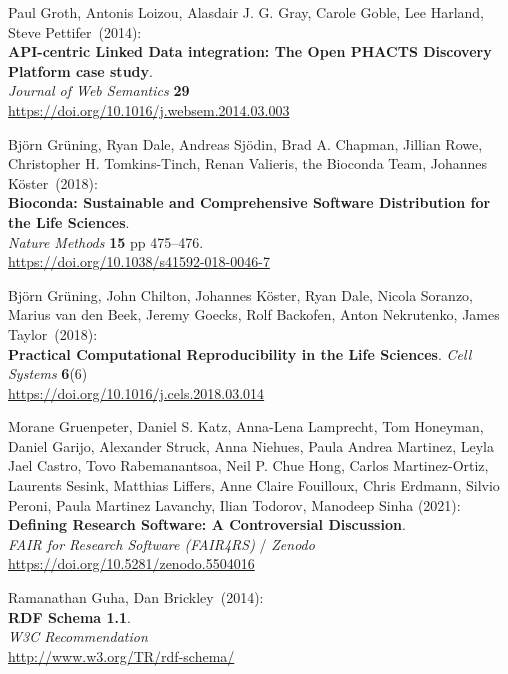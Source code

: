 \begin{thebibliography}{9}
Paul Groth, Antonis Loizou, Alasdair J. G. Gray, Carole Goble, Lee Harland, Steve Pettifer~(2014): \\
\textbf{API-centric Linked Data integration: {The Open PHACTS Discovery Platform} case study}.\\
\emph{Journal of Web Semantics} \textbf{29} \\
\url{https://doi.org/10.1016/j.websem.2014.03.003}

Björn Grüning, Ryan Dale, Andreas Sjödin, Brad A. Chapman, Jillian Rowe, Christopher H. Tomkins-Tinch, Renan Valieris, the Bioconda Team, Johannes Köster~(2018): \\
\textbf{Bioconda: Sustainable and Comprehensive Software Distribution for the Life Sciences}.\\
\emph{Nature Methods} \textbf{15} pp 475--476.\\
\url{https://doi.org/10.1038/s41592-018-0046-7}

Björn Grüning, John Chilton, Johannes Köster, Ryan Dale, Nicola Soranzo, Marius van den Beek, Jeremy Goecks, Rolf Backofen, Anton Nekrutenko, James Taylor~(2018): \\
\textbf{Practical Computational Reproducibility in the Life Sciences}.
\emph{Cell Systems} \textbf{6}(6)\\
\url{https://doi.org/10.1016/j.cels.2018.03.014}

Morane Gruenpeter, Daniel S. Katz, Anna-Lena Lamprecht, Tom Honeyman, Daniel Garijo, Alexander Struck, Anna Niehues, Paula Andrea Martinez, Leyla Jael Castro, Tovo Rabemanantsoa, Neil P. Chue Hong, Carlos Martinez-Ortiz, Laurents Sesink, Matthias Liffers, Anne Claire Fouilloux, Chris Erdmann, Silvio Peroni, Paula Martinez Lavanchy, Ilian Todorov, Manodeep Sinha (2021): \\
\textbf{Defining Research Software: A Controversial Discussion}. \\
\emph{FAIR for Research Software (FAIR4RS)} / \emph{Zenodo} \\
\url{https://doi.org/10.5281/zenodo.5504016}

Ramanathan Guha, Dan Brickley~(2014): \\
\textbf{RDF Schema 1.1}.\\
\emph{W3C Recommendation} \\
\url{http://www.w3.org/TR/rdf-schema/}


\end{thebibliography}
